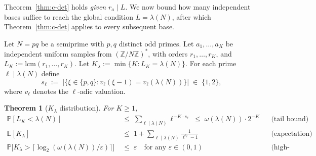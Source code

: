 \documentclass[11pt]{article}
\newtheorem{theorem}{Theorem}
\begin{document}
Theorem~\ref{thm:c-det} holds \emph{given} $r_a \mid L$. We now bound how many independent bases suffice to reach the global condition $L = \lambda(N)$, after which Theorem~\ref{thm:c-det} applies to every subsequent base.

Let $N = pq$ be a semiprime with $p, q$ distinct odd primes. Let $a_1, \ldots, a_K$ be independent uniform samples from $(\mathbb{Z}/N\mathbb{Z})^*$, with orders $r_1, \ldots, r_K$, and $L_K := \mathrm{lcm}(r_1, \ldots, r_K)$. Let $K_\lambda := \min\{K : L_K = \lambda(N)\}$. For each prime $\ell \mid \lambda(N)$ define
\[
  s_\ell \;:=\; \bigl|\bigl\{\xi \in \{p, q\} : v_\ell(\xi - 1) = v_\ell(\lambda(N))\bigr\}\bigr| \;\in\; \{1, 2\},
\]
where $v_\ell$ denotes the $\ell$-adic valuation.

\begin{theorem}[$K_\lambda$ distribution]\label{thm:k-lambda}
For $K \geq 1$,
\begin{align}
  \mathbb{P}[L_K < \lambda(N)] \;&\leq\; \sum_{\ell \mid \lambda(N)} \ell^{-K \cdot s_\ell} \;\leq\; \omega(\lambda(N)) \cdot 2^{-K} && \text{(tail bound)} \\
  \mathbb{E}[K_\lambda] \;&\leq\; 1 + \sum_{\ell \mid \lambda(N)} \frac{1}{\ell^{s_\ell} - 1} && \text{(expectation)} \\
  \mathbb{P}\bigl[K_\lambda > \lceil \log_2(\omega(\lambda(N))/\varepsilon) \rceil\bigr] \;&\leq\; \varepsilon \quad \text{for any } \varepsilon \in (0, 1) && \text{(high-probability)}
\end{align}
\end{theorem}
\end{document}
